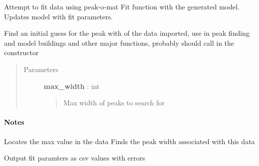 \documentclass[letterpaper,10pt,english]{sphinxmanual}
\begin{document}
\begin{fulllineitems}
\begin{fulllineitems}
\end{fulllineitems}


\begin{fulllineitems}
\label{spectra:spectra.Spectra.fit_data}
Attempt to fit data using peak-o-mat Fit function with the 
generated model. Updates model with fit parameters.

\end{fulllineitems}


\begin{fulllineitems}
\label{spectra:spectra.Spectra.guess_peak_width}
Find an initial guess for the peak with of the data imported, 
use in peak finding and model buildings and other major functions, 
probably should call in the constructor
\begin{quote}\begin{description}
\item[{Parameters}] \leavevmode
\textbf{max\_width} : int
\begin{quote}

Max width of peaks to search for
\end{quote}

\end{description}\end{quote}
\paragraph{Notes}

Locates the max value in the data
Finds the peak width associated with this data

\end{fulllineitems}


\begin{fulllineitems}
\label{spectra:spectra.Spectra.output_results}
Output fit paramters as csv values with errors

\end{fulllineitems}



\end{fulllineitems}
\end{document}
